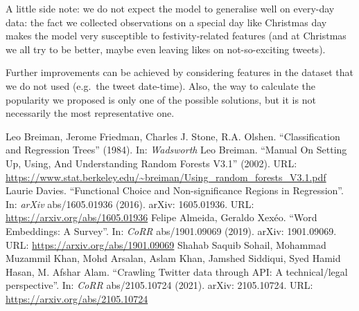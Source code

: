 \documentclass[letterpaper,11pt,english,twocolumn]{article}
\begin{document}
A little side note: we do not expect the model to generalise well on every-day data: the fact we collected observations on a special day like Christmas day makes the model very susceptible to festivity-related features (and at Christmas we all try to be better, maybe even leaving likes on not-so-exciting tweets).

Further improvements can be achieved by considering features in the dataset that we do not used (e.g.~the tweet date-time). Also, the way to calculate the popularity we proposed is only one of the possible solutions, but it is not necessarily the most representative one.



\begin{thebibliography}{99}
\footnotesize
	 Leo Breiman, Jerome Friedman, Charles J. Stone, R.A. Olshen. ``Classification and Regression Trees'' (1984). In: \textit{Wadsworth} 
	 Leo Breiman. ``Manual On Setting Up, Using, And Understanding Random Forests V3.1'' (2002). URL: \url{https://www.stat.berkeley.edu/~breiman/Using_random_forests_V3.1.pdf}
	 Laurie Davies. ``Functional Choice and Non-significance Regions in Regression''. In: \textit{arXiv} abs/1605.01936 (2016). arXiv: 1605.01936. URL: \url{https://arxiv.org/abs/1605.01936}
	 Felipe Almeida, Geraldo Xex\'{e}o. ``Word Embeddings: A Survey''. In: \textit{CoRR} abs/1901.09069 (2019). arXiv: 1901.09069. URL: \url{https://arxiv.org/abs/1901.09069}
	 Shahab Saquib Sohail, Mohammad Muzammil Khan, Mohd Arsalan, Aslam Khan, Jamshed Siddiqui, Syed Hamid Hasan, M. Afshar Alam. ``Crawling Twitter data through API: A technical/legal perspective''. In: \textit{CoRR} abs/2105.10724 (2021). arXiv: 2105.10724. URL: \url{https://arxiv.org/abs/2105.10724}
\end{thebibliography}
\end{document}
